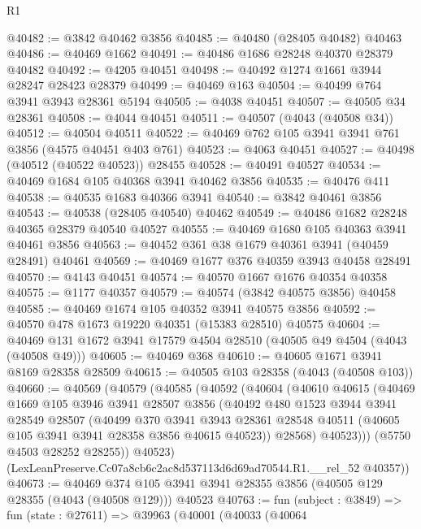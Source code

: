 \begin{lexlean}{R1}
\begin{coremodule}
@40482 := @3842 @40462 @3856
@40485 := @40480 (@28405 @40482) @40463
@40486 := @40469 @1662
@40491 := @40486 @1686 @28248 @40370 @28379 @40482
@40492 := @4205 @40451
@40498 := @40492 @1274 @1661 @3944 @28247 @28423 @28379
@40499 := @40469 @163
@40504 := @40499 @764 @3941 @3943 @28361 @5194
@40505 := @4038 @40451
@40507 := @40505 @34 @28361
@40508 := @4044 @40451
@40511 := @40507 (@4043 (@40508 @34))
@40512 := @40504 @40511
@40522 := @40469 @762 @105 @3941 @3941 @761 @3856 (@4575 @40451 @403 @761)
@40523 := @4063 @40451
@40527 := @40498 (@40512 (@40522 @40523)) @28455
@40528 := @40491 @40527
@40534 := @40469 @1684 @105 @40368 @3941 @40462 @3856
@40535 := @40476 @411
@40538 := @40535 @1683 @40366 @3941
@40540 := @3842 @40461 @3856
@40543 := @40538 (@28405 @40540) @40462
@40549 := @40486 @1682 @28248 @40365 @28379 @40540 @40527
@40555 := @40469 @1680 @105 @40363 @3941 @40461 @3856
@40563 := @40452 @361 @38 @1679 @40361 @3941 (@40459 @28491) @40461
@40569 := @40469 @1677 @376 @40359 @3943 @40458 @28491
@40570 := @4143 @40451
@40574 := @40570 @1667 @1676 @40354 @40358
@40575 := @1177 @40357
@40579 := @40574 (@3842 @40575 @3856) @40458
@40585 := @40469 @1674 @105 @40352 @3941 @40575 @3856
@40592 := @40570 @478 @1673 @19220 @40351 (@15383 @28510) @40575
@40604 := @40469 @131 @1672 @3941 @17579 @4504 @28510 (@40505 @49 @4504 (@4043 (@40508 @49)))
@40605 := @40469 @368
@40610 := @40605 @1671 @3941 @8169 @28358 @28509
@40615 := @40505 @103 @28358 (@4043 (@40508 @103))
@40660 := @40569
    (@40579
      (@40585
        (@40592
          (@40604
            (@40610
              @40615
              (@40469
                @1669
                @105
                @3946
                @3941
                @28507
                @3856
                (@40492
                  @480
                  @1523
                  @3944
                  @3941
                  @28549
                  @28507
                  (@40499
                    @370
                    @3941
                    @3943
                    @28361
                    @28548
                    @40511
                    (@40605 @105 @3941 @3941 @28358 @3856 @40615 @40523))
                  @28568)
                @40523)))
          (@5750 @4503 @28252 @28255))
        @40523)
      (LexLeanPreserve.Cc07a8cb6c2ac8d537113d6d69ad70544.R1.__rel_52 @40357))
@40673 := @40469
    @374
    @105
    @3941
    @3941
    @28355
    @3856
    (@40505 @129 @28355 (@4043 (@40508 @129)))
    @40523
@40763 := fun (subject : @3849) =>
  fun (state : @27611) =>
  @39963
    (@40001
      (@40033
        (@40064

\end{coremodule}
\end{lexlean}
